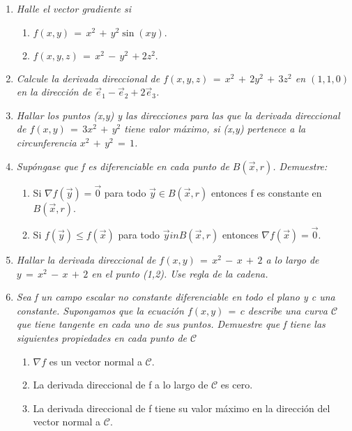 \documentclass[12pt]{article}
\begin{document}
	\begin{enumerate}
		\item \textit{Halle  el vector gradiente si}
		
		\begin{enumerate}
		    \item $f(x,y) \, = \, x^{2} \, + \, y^{2} \sin(xy).$
		    \item $f(x,y,z) \, = \, x^{2} \, - \, y^{2} \, +2z^{2}.$
		\end{enumerate}
		
		\item \textit{Calcule la derivada direccional de $f(x,y,z) \, = \, x^{2} \, + \, 2y^{2} \, + \, 3z^{2}$ en $(1,1,0)$ en la dirección de $\vec{e}_{1} - \vec{e}_{2} + 2\vec{e}_{3}$.}
		
		\item \textit{Hallar los puntos (x,y) y las direcciones para las que la derivada direccional de $f(x,y) \, = \, 3x^{2} \, + \, y^{2}$ tiene valor máximo, si (x,y) pertenece a la circunferencia $x^{2} \, + \, y^{2} \, = \, 1$.}
		
		\item \textit{Supóngase que f es diferenciable en cada punto de $B(\vec{x}, r)$. Demuestre:}
		
		\begin{enumerate}
		    \item Si $\nabla f(\vec{y}) = \vec{0}$ para todo $\vec{y} \in B(\vec{x}, r)$ entonces f es constante en $B(\vec{x}, r)$.
		    \item Si $f(\vec{y}) \leqslant f(\vec{x})$ para todo $\vec{y} in B(\vec{x}, r)$ entonces $\nabla f(\vec{x}) = \vec{0}.$
		\end{enumerate}
		
		\item \textit{Hallar la derivada direccional de $f(x,y) \, = \, x^{2} \, - \, x \, + \, 2$ a lo largo de $y \, = \, x^{2} \, - \, x \, + \, 2$ en el punto (1,2). Use regla de la cadena.}
		
		\item \textit{Sea f un campo escalar no constante diferenciable en todo el plano y c una constante. Supongamos que la ecuación $f(x,y) \, = \, c$ describe una curva $\mathscr{C}$ que tiene tangente en cada uno de sus puntos. Demuestre que f tiene las siguientes propiedades en cada punto de $\mathscr{C}$}
		
		\begin{enumerate}
		    \item $\nabla f$ es un vector normal a $\mathscr{C}$.
		    \item La derivada direccional de f a lo largo de $\mathscr{C}$ es cero.
		    \item La derivada direccional de f tiene su valor máximo en la dirección del vector normal a $\mathscr{C}$.
		\end{enumerate}
		

\end{enumerate}
\end{document}
